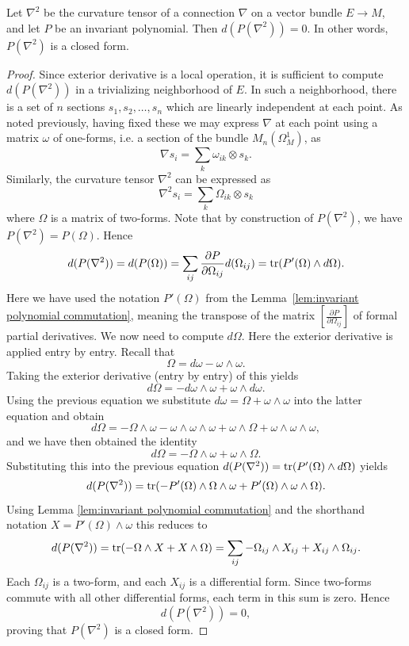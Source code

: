 \documentclass[a4paper,openany]{scrbook}
\begin{document}
\begin{prop}
Let $\nabla^2$ be the curvature tensor of a connection $\nabla$ on a vector bundle $E \to M$, and let $P$ be an invariant polynomial. Then $d(P(\nabla^2)) = 0$. In other words, $P(\nabla^2)$ is a closed form.
\begin{proof}
Since exterior derivative is a local operation, it is sufficient to compute $d(P(\nabla^2))$ in a trivializing neighborhood of $E$. In such a neighborhood, there is a set of $n$ sections $s_1, s_2, \ldots, s_n$ which are linearly independent at each point. As noted previously, having fixed these we may express $\nabla$ at each point using a matrix $\omega$ of one-forms, i.e. a section of the bundle $M_n(\Omega_M^1)$, as
\[\nabla s_i = \sum_k \omega_{ik} \otimes s_k.\]
Similarly, the curvature tensor $\nabla^2$ can be expressed as
\[\nabla^2 s_i = \sum_k \Omega_{ik} \otimes s_k\]
where $\Omega$ is a matrix of two-forms. Note that by construction of $P(\nabla^2)$, we have $P(\nabla^2) = P(\Omega)$. Hence
\[d(P(\nabla^2)) = d(P(\Omega)) = \sum_{ij} \frac{\partial P}{\partial \Omega_{ij}} d(\Omega_{ij}) = \operatorname{tr}(P'(\Omega) \wedge d\Omega).\]
Here we have used the notation $P'(\Omega)$ from the Lemma~\ref{lem:invariant polynomial commutation}, meaning the transpose of the matrix $[\frac{\partial P}{\partial \Omega_{ij}}]$ of formal partial derivatives. We now need to compute $d\Omega$. Here the exterior derivative is applied entry by entry. Recall that
\[\Omega = d\omega - \omega \wedge \omega.\]
Taking the exterior derivative (entry by entry) of this yields
\[d\Omega = -d\omega \wedge \omega + \omega \wedge d\omega.\]
Using the previous equation we substitute $d\omega = \Omega + \omega \wedge \omega$ into the latter equation and obtain
\[d\Omega = -\Omega \wedge \omega - \omega \wedge \omega \wedge \omega + \omega \wedge \Omega + \omega \wedge \omega \wedge \omega,\]
and we have then obtained the identity
\[d\Omega = -\Omega \wedge \omega + \omega \wedge \Omega.\]
Substituting this into the previous equation $d(P(\nabla^2)) = \operatorname{tr}(P'(\Omega) \wedge d\Omega)$ yields
\[d(P(\nabla^2)) = \operatorname{tr}(-P'(\Omega) \wedge \Omega \wedge \omega + P'(\Omega) \wedge \omega \wedge \Omega).\]
Using Lemma \ref{lem:invariant polynomial commutation} and the shorthand notation $X = P'(\Omega) \wedge \omega$ this reduces to
\[d(P(\nabla^2)) = \operatorname{tr}(-\Omega \wedge X + X \wedge \Omega) = \sum_{ij} -\Omega_{ij} \wedge X_{ij} + X_{ij} \wedge \Omega_{ij}.\]
Each $\Omega_{ij}$ is a two-form, and each $X_{ij}$ is a differential form. Since two-forms commute with all other differential forms, each term in this sum is zero. Hence
\[d(P(\nabla^2)) = 0,\]
proving that $P(\nabla^2)$ is a closed form.
\end{proof}
\end{prop}
\end{document}

